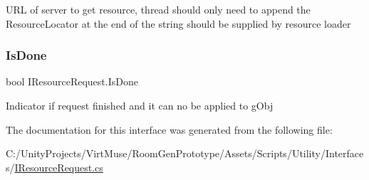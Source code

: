 U\+RL of server to get resource, thread should only need to append the Resource\+Locator at the end of the string should be supplied by resource loader 

\mbox{\label{interface_i_resource_request_a3f805c8d561c119c795598b98611fb90}} 
\subsubsection{\texorpdfstring{Is\+Done}{IsDone}}
{\footnotesize\ttfamily bool I\+Resource\+Request.\+Is\+Done\hspace{0.3cm}{\ttfamily [get]}}



Indicator if request finished and it can no be applied to g\+Obj 



The documentation for this interface was generated from the following file\+:\begin{DoxyCompactItemize}
\item 
C\+:/\+Unity\+Projects/\+Virt\+Muse/\+Room\+Gen\+Prototype/\+Assets/\+Scripts/\+Utility/\+Interfaces/\mbox{\hyperlink{_i_resource_request_8cs}{I\+Resource\+Request.\+cs}}\end{DoxyCompactItemize}
